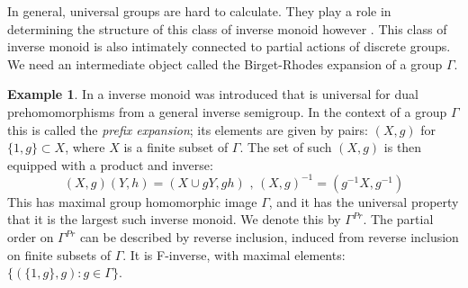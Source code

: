 \documentclass[11pt,a4paper]{amsart}
\theoremstyle{plain}
\theoremstyle{definition}%
\newtheorem{example}[theorem]{Example}%
\theoremstyle{remark}%
\begin{document}
In general, universal groups are hard to calculate. They play a role in determining the structure of this class of inverse monoid however \cite{MR2058453}. This class of inverse monoid is also intimately connected to partial actions of discrete groups. We need an intermediate object called the Birget-Rhodes expansion \cite{MR745358}  of a group $\Gamma$.

\begin{example}
In \cite{MR745358,MR2221438} a inverse monoid was introduced that is universal for dual prehomomorphisms from a general inverse semigroup. In the context of a group $\Gamma$ this is called the \textit{prefix expansion}; its elements are given by pairs: $(X,g)$ for $\lbrace 1,g\rbrace \subset X$, where $X$ is a finite subset of $\Gamma$. The set of such $(X,g)$ is then equipped with a product and inverse:
\begin{equation*}
(X,g)(Y,h) = (X\cup gY,gh)\mbox{ , } (X,g)^{-1}=(g^{-1}X,g^{-1})
\end{equation*}
This has maximal group homomorphic image $\Gamma$, and it has the universal property that it is the largest such inverse monoid. We denote this by $\Gamma^{Pr}$. The partial order on $\Gamma^{Pr}$ can be described by reverse inclusion, induced from reverse inclusion on finite subsets of $\Gamma$. It is F-inverse, with maximal elements: $\lbrace(\lbrace 1,g \rbrace, g):g \in \Gamma \rbrace$.
\end{example}
\end{document}
